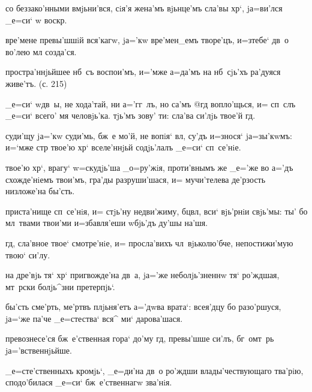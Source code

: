  со беззако'нными вмjьни'вся, сiя'я жена'мъ 
вjьнце'мъ сла'вы хр`, jа=ви'лся _е=си` w\т 
воскр.


 вре'мене превы'шшiй вся'кагw, jа='кw 
вре'мен_емъ творе'цъ, и=з\ъ тебе` дв~о во'лею мл 
созда'ся.

 простра'ннjьйшее нб~съ воспои'мъ, и='мже 
а=да'мъ на нб~сjь'хъ ра'дуяся живе'тъ. (с. 215)


  _е=си` w\т дв~ы, не хода'тай, 
ни а='гг~лъ, но са'мъ @гд вопло'щься, и= 
сп~слъ _е=си` всего' мя человjь'ка. тjь'мъ зову' ти: 
сла'ва си'лjь твое'й гд.

 суди'щу jа='кw суди'мь, бж~е мо'й, не 
вопiя` вл, су'дъ и=знося` jа=зы'кwмъ: и=`мже стр 
твое'ю хр` вселе'ннjьй содjь'лалъ _е=си` сп~се'нiе.

 твое'ю хр`, врагу` w=скудjь'ша 
_о=ру'жiя, проти'внымъ же _е='же во а='дъ схожде'нiемъ 
твои'мъ, гра'ды разруши'шася, и= мучи'телева де'рзость 
низложе'на бы'сть.

  приста'нище сп~се'нiя, и= 
стjь'ну недви'жиму, бц вл, вси` вjь'рнiи свjь'мы: 
ты' бо мл~твами твои'ми и=збавля'еши w\т бjь'дъ ду'шы 
на'шя.


  гд, сла'вное твое` 
смотре'нiе, и= просла'вихъ чл~вjьколю'бче, непостижи'мую 
твою` си'лу.

 на дре'вjь тя` хр` пригвожде'на 
дв~а, jа='же неболjь'зненнw тя` ро'ждшая, мт~рски 
болjь^зни претерпjь`.

 бы'сть сме'рть, ме'ртвъ плjьня'етъ 
а='дwва врата`: всея'дцу бо разо'ршуся, jа=`же па'че 
_е=стества` вся^ ми` дарова'шася.


 превознесе'ся бж~е'ственная гора` до'му 
гд, превы'шше си'лъ, бг~омт~рь jа='вственнjьйше.

 _е=сте'ственныхъ кромjь`, _е=ди'на дв~о 
ро'ждши влады'чествующаго тва'рiю, сподо'билася _е=си` 
бж~е'ственнагw зва'нiя.


